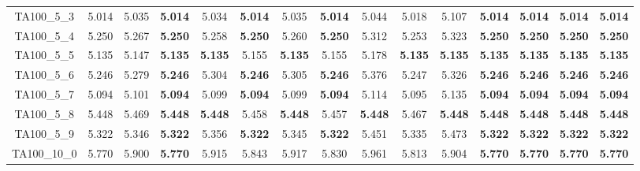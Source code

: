 \begin{tabular}{cc||ccccccccccccc}
TA100\_5\_3        & 5.014            & 5.035            & {\bf 5.014}      & 5.034            & {\bf 5.014}      & 5.035            & {\bf 5.014}      & 5.044            & 5.018            & 5.107            & {\bf 5.014}      & {\bf 5.014}      & {\bf 5.014}      & {\bf 5.014}     \\ 
TA100\_5\_4        & 5.250            & 5.267            & {\bf 5.250}      & 5.258            & {\bf 5.250}      & 5.260            & {\bf 5.250}      & 5.312            & 5.253            & 5.323            & {\bf 5.250}      & {\bf 5.250}      & {\bf 5.250}      & {\bf 5.250}     \\ 
TA100\_5\_5        & 5.135            & 5.147            & {\bf 5.135}      & {\bf 5.135}      & 5.155            & {\bf 5.135}      & 5.155            & 5.178            & {\bf 5.135}      & {\bf 5.135}      & {\bf 5.135}      & {\bf 5.135}      & {\bf 5.135}      & {\bf 5.135}     \\ 
TA100\_5\_6        & 5.246            & 5.279            & {\bf 5.246}      & 5.304            & {\bf 5.246}      & 5.305            & {\bf 5.246}      & 5.376            & 5.247            & 5.326            & {\bf 5.246}      & {\bf 5.246}      & {\bf 5.246}      & {\bf 5.246}     \\ 
TA100\_5\_7        & 5.094            & 5.101            & {\bf 5.094}      & 5.099            & {\bf 5.094}      & 5.099            & {\bf 5.094}      & 5.114            & 5.095            & 5.135            & {\bf 5.094}      & {\bf 5.094}      & {\bf 5.094}      & {\bf 5.094}     \\ 
TA100\_5\_8        & 5.448            & 5.469            & {\bf 5.448}      & {\bf 5.448}      & 5.458            & {\bf 5.448}      & 5.457            & {\bf 5.448}      & 5.467            & {\bf 5.448}      & {\bf 5.448}      & {\bf 5.448}      & {\bf 5.448}      & {\bf 5.448}     \\ 
TA100\_5\_9        & 5.322            & 5.346            & {\bf 5.322}      & 5.356            & {\bf 5.322}      & 5.345            & {\bf 5.322}      & 5.451            & 5.335            & 5.473            & {\bf 5.322}      & {\bf 5.322}      & {\bf 5.322}      & {\bf 5.322}     \\ 
TA100\_10\_0       & 5.770            & 5.900            & {\bf 5.770}      & 5.915            & 5.843            & 5.917            & 5.830            & 5.961            & 5.813            & 5.904            & {\bf 5.770}      & {\bf 5.770}      & {\bf 5.770}      & {\bf 5.770}     \\ 

\end{tabular}
